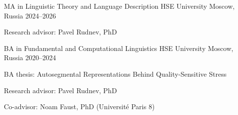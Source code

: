 

\begin{cventries}

    
  \cventry
    {MA in Linguistic Theory and Language Description} %
    {HSE University} %
    {Moscow, Russia} %
    {2024--2026} %
    {
      \begin{cvitems} %
        \item {Research advisor: Pavel Rudnev, PhD}
      \end{cvitems}
    }

  \cventry
    {BA in Fundamental and Computational Linguistics} %
    {HSE University} %
    {Moscow, Russia} %
    {2020--2024} %
    {
      \begin{cvitems} %
        \item {BA thesis: Autosegmental Representations Behind Quality-Sensitive Stress}
        \item {Research advisor: Pavel Rudnev, PhD}
        	\item {Co-advisor: Noam Faust, PhD (Université Paris 8)}
      \end{cvitems}
    }

\end{cventries}
